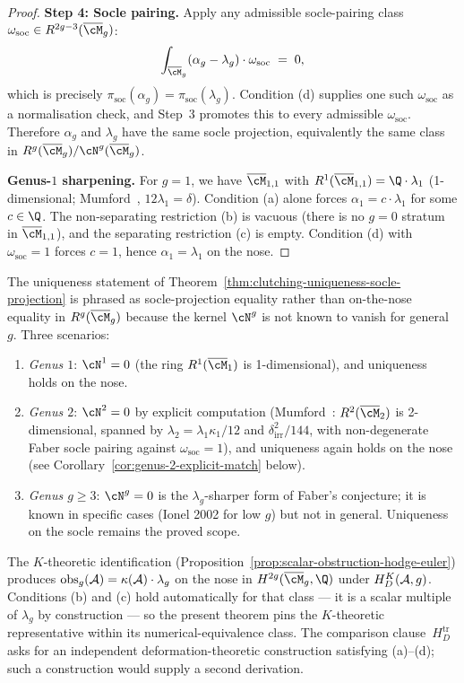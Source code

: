 \begin{proof}
\textbf{Step 4: Socle pairing.} Apply any admissible socle-pairing
class $\omega_{\mathrm{soc}} \in R^{2g-3}(\overline{\cM}_g)$:
\[
\int_{\overline{\cM}_g}(\alpha_g - \lambda_g)\cdot\omega_{\mathrm{soc}}
\;=\; 0,
\]
which is precisely
$\pi_{\mathrm{soc}}(\alpha_g) = \pi_{\mathrm{soc}}(\lambda_g)$.
Condition (d) supplies one such $\omega_{\mathrm{soc}}$ as a
normalisation check, and Step~3 promotes this to every admissible
$\omega_{\mathrm{soc}}$. Therefore $\alpha_g$ and $\lambda_g$
have the same socle projection, equivalently the same class in
$R^g(\overline{\cM}_g)/\cN^g(\overline{\cM}_g)$.

\textbf{Genus-$1$ sharpening.} For $g = 1$, we have
$\overline{\cM}_{1,1}$ with
$R^1(\overline{\cM}_{1,1}) = \Q\cdot\lambda_1$
(1-dimensional; Mumford~\cite{Mumford83}, $12\lambda_1 = \delta$).
Condition (a) alone forces $\alpha_1 = c\cdot\lambda_1$ for some
$c \in \Q$. The non-separating restriction (b) is vacuous
(there is no $g=0$ stratum in $\overline{\cM}_{1,1}$), and the
separating restriction (c) is empty. Condition (d) with
$\omega_{\mathrm{soc}} = 1$ forces $c = 1$, hence
$\alpha_1 = \lambda_1$ on the nose.
\end{proof}

\begin{remark}
\label{rem:socle-scope-explanation}
The uniqueness statement of
Theorem~\ref{thm:clutching-uniqueness-socle-projection} is phrased
as socle-projection equality rather than on-the-nose equality in
$R^g(\overline{\cM}_g)$ because the kernel $\cN^g$ is not known to
vanish for general $g$. Three scenarios:
\begin{enumerate}[label=\textup{(\roman*)}]
\item \emph{Genus $1$}: $\cN^1 = 0$ (the ring $R^1(\overline{\cM}_1)$
is 1-dimensional), and uniqueness holds on the nose.
\item \emph{Genus $2$}: $\cN^2 = 0$ by explicit computation
(Mumford~\cite{Mumford83}: $R^2(\overline{\cM}_2)$ is 2-dimensional,
spanned by $\lambda_2 = \lambda_1\kappa_1/12$ and
$\delta_{\mathrm{irr}}^2/144$, with non-degenerate Faber socle
pairing against $\omega_{\mathrm{soc}} = 1$), and uniqueness again
holds on the nose (see
Corollary~\ref{cor:genus-2-explicit-match} below).
\item \emph{Genus $g \geq 3$}: $\cN^g = 0$ is the
$\lambda_g$-sharper form of Faber's conjecture; it is known in
specific cases (Ionel 2002 for low $g$) but not in general.
	Uniqueness on the socle remains the proved scope.
\end{enumerate}
The $K$-theoretic identification
(Proposition~\ref{prop:scalar-obstruction-hodge-euler}) produces
$\mathrm{obs}_g(\mathcal{A}) = \kappa(\mathcal{A})\cdot\lambda_g$ on the nose in
$H^{2g}(\overline{\cM}_g,\Q)$ under $H_D^K(\mathcal{A},g)$.
Conditions (b) and (c) hold automatically for that
class --- it is a scalar multiple of $\lambda_g$ by construction ---
so the present theorem pins the $K$-theoretic representative within
its numerical-equivalence class.  The comparison
clause~$H_D^{\mathrm{tr}}$ asks for an independent
deformation-theoretic construction satisfying (a)--(d); such a
construction would supply a second derivation.
\end{remark}

